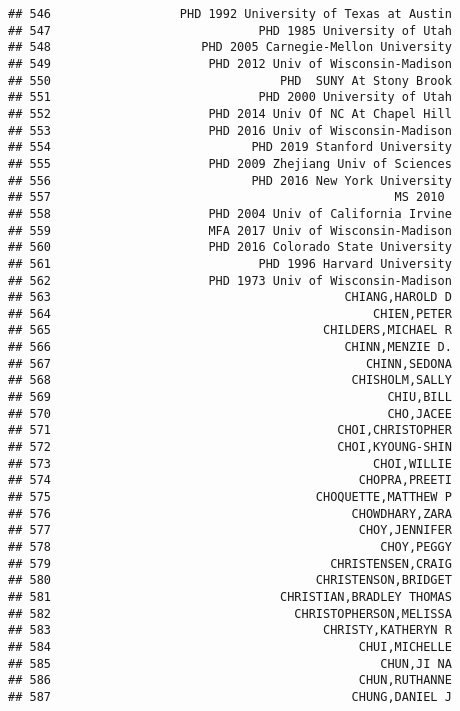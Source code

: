 \documentclass[
]{article}
\begin{document}
\begin{verbatim}
## 546                  PHD 1992 University of Texas at Austin
## 547                             PHD 1985 University of Utah
## 548                     PHD 2005 Carnegie-Mellon University
## 549                      PHD 2012 Univ of Wisconsin-Madison
## 550                                PHD  SUNY At Stony Brook
## 551                             PHD 2000 University of Utah
## 552                      PHD 2014 Univ Of NC At Chapel Hill
## 553                      PHD 2016 Univ of Wisconsin-Madison
## 554                            PHD 2019 Stanford University
## 555                      PHD 2009 Zhejiang Univ of Sciences
## 556                            PHD 2016 New York University
## 557                                                MS 2010 
## 558                      PHD 2004 Univ of California Irvine
## 559                      MFA 2017 Univ of Wisconsin-Madison
## 560                      PHD 2016 Colorado State University
## 561                             PHD 1996 Harvard University
## 562                      PHD 1973 Univ of Wisconsin-Madison
## 563                                         CHIANG,HAROLD D
## 564                                             CHIEN,PETER
## 565                                      CHILDERS,MICHAEL R
## 566                                         CHINN,MENZIE D.
## 567                                            CHINN,SEDONA
## 568                                          CHISHOLM,SALLY
## 569                                               CHIU,BILL
## 570                                               CHO,JACEE
## 571                                        CHOI,CHRISTOPHER
## 572                                        CHOI,KYOUNG-SHIN
## 573                                             CHOI,WILLIE
## 574                                           CHOPRA,PREETI
## 575                                     CHOQUETTE,MATTHEW P
## 576                                          CHOWDHARY,ZARA
## 577                                           CHOY,JENNIFER
## 578                                              CHOY,PEGGY
## 579                                       CHRISTENSEN,CRAIG
## 580                                     CHRISTENSON,BRIDGET
## 581                                CHRISTIAN,BRADLEY THOMAS
## 582                                  CHRISTOPHERSON,MELISSA
## 583                                      CHRISTY,KATHERYN R
## 584                                           CHUI,MICHELLE
## 585                                              CHUN,JI NA
## 586                                           CHUN,RUTHANNE
## 587                                          CHUNG,DANIEL J

\end{verbatim}
\end{document}

